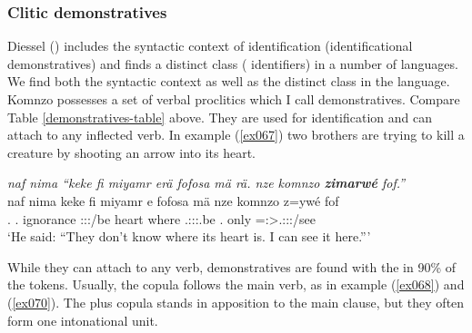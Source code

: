 \subsubsection{Clitic demonstratives} \label{demonstrative-identifiers}

Diessel (\citeyear{Diessel:2009tg}) includes the syntactic context of identification (identificational demonstratives) and finds a distinct class ( identifiers) in a number of languages. We find both the syntactic context as well as the distinct class in the language.\\

Komnzo possesses a set of  verbal proclitics which I call  demonstratives. Compare Table \ref{demonstratives-table} above. They are used for identification and can attach to any inflected verb. In example (\ref{ex067}) two brothers are trying to kill a creature by shooting an arrow into its heart.

\begin{exe}
	\ex \emph{naf nima ``keke fi miyamr erä fofosa mä rä. nze komnzo \textbf{zimarwé} fof.''}\\
	\gll naf nima keke fi miyamr e fofosa mä  nze komnzo z=ywé fof\\
	\Tsg.\Erg{} \Quot{} \Neg{} \Third.\Abs{} ignorance \Stpl:\Sbj:\Nonpast:\Ipfv/be heart where \Tsg.\F:\Sbj:\Nonpast:\Ipfv.be \Fsg.\Erg{} only \Prox=\Fsg:\Sbj>\Tsg.\Masc:\Obj:\Nonpast:\Ipfv/see \Emph{}\\
	\trans `He said: ``They don't know where its heart is. I can see it here.'''\\
	\label{ex067}
\end{exe}

While they can attach to any verb,  demonstratives are found with the  in 90\% of the tokens. Usually, the copula follows the main verb, as in example (\ref{ex068}) and (\ref{ex070}). The   plus copula stands in apposition to the main clause, but they often form one intonational unit.

